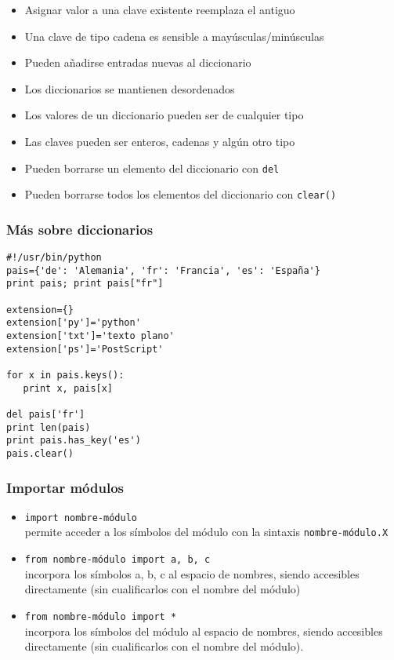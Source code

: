 \begin{frame}[fragile]

  \begin{itemize}
  \item Asignar valor a una clave existente reemplaza el antiguo 
  \item Una clave de tipo cadena es sensible a mayúsculas/minúsculas
  \item Pueden añadirse entradas nuevas al diccionario
  \item Los diccionarios se mantienen desordenados
\item Los valores de un diccionario pueden ser de cualquier tipo
\item Las claves pueden ser enteros, cadenas y algún otro tipo
\item Pueden borrarse un elemento del diccionario con \verb|del|
\item Pueden borrarse todos los elementos del diccionario con \verb|clear()|
\end{itemize}

\end{frame}


\begin{frame}[fragile]
\frametitle{Más sobre diccionarios}
  \begin{footnotesize}
\begin{verbatim}
#!/usr/bin/python
pais={'de': 'Alemania', 'fr': 'Francia', 'es': 'España'}
print pais; print pais["fr"]

extension={}
extension['py']='python'
extension['txt']='texto plano'
extension['ps']='PostScript'

for x in pais.keys():
   print x, pais[x]

del pais['fr']   
print len(pais)
print pais.has_key('es')
pais.clear()

\end{verbatim}
  \end{footnotesize}

\end{frame}



\begin{frame}[fragile]
\frametitle{Importar módulos}

\begin{itemize}
\item \verb|import nombre-módulo               | \\permite acceder a los
  símbolos del módulo con la sintaxis \verb|nombre-módulo.X|
\item \verb|from nombre-módulo import a, b, c  | \\incorpora
  los símbolos a, b, c al espacio de nombres, siendo accesibles
  directamente (sin cualificarlos con el nombre del módulo)
\item \verb|from nombre-módulo import *        | \\incorpora los
  símbolos del módulo al espacio de nombres, siendo accesibles
  directamente (sin cualificarlos con el nombre del módulo).
\end{itemize}
\end{frame}

